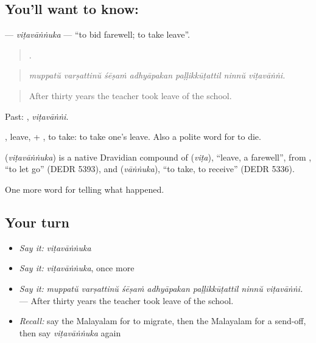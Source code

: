 \subsection*{You'll want to know: }
\textbf{} — \emph{viṭavāṅṅuka} — \textquotedblleft{}to bid farewell; to take leave\textquotedblright{}.

\begin{quote}
      .
\end{quote}

\begin{quote}
\emph{muppatŭ varṣattinŭ śēṣaṁ adhyāpakan paḷḷikkūṭattil ninnŭ viṭavāṅṅi.}
\end{quote}

\begin{quote}
After thirty years the teacher took leave of the school.
\end{quote}

Past: , \emph{viṭavāṅṅi}.

, leave, + , to take: to take one's leave. Also a polite word for to die.

\begin{cousinweb}
\textbf{} (\emph{viṭavāṅṅuka}) is a native Dravidian compound of  (\emph{viṭa}), \textquotedblleft{}leave, a farewell\textquotedblright{}, from , \textquotedblleft{}to let go\textquotedblright{} (DEDR 5393), and  (\emph{vāṅṅuka}), \textquotedblleft{}to take, to receive\textquotedblright{} (DEDR 5336).
\end{cousinweb}

\begin{grammarlens}[title={What you've built}]
One more word for telling what happened.
\end{grammarlens}

\subsection*{Your turn}
\begin{itemize}
\raggedright
  \item \emph{Say it:} \emph{viṭavāṅṅuka}
  \item \emph{Say it:} \emph{viṭavāṅṅuka}, once more
  \item \emph{Say it:} \emph{muppatŭ varṣattinŭ śēṣaṁ adhyāpakan paḷḷikkūṭattil ninnŭ viṭavāṅṅi.} — After thirty years the teacher took leave of the school.
  \item \emph{Recall:} say the Malayalam for to migrate, then the Malayalam for a send-off, then say \emph{viṭavāṅṅuka} again
\end{itemize}

